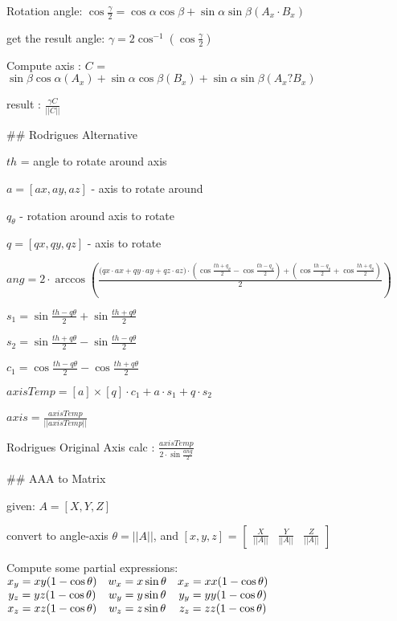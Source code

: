 Rotation angle: $\cos \frac{\gamma}{2} = \cos \alpha   \cos \beta  + \sin \alpha    \sin \beta  (  A_x \cdot B_x )$

get the result angle: $ \gamma = 2 \cos^{-1}( \cos \frac {\gamma}{2} )$


Compute axis : $C$ = $  \sin \beta  \cos \alpha  (A_x)  + \sin \alpha  \cos \beta (B_x) + \sin \alpha \sin \beta  ( A_x ? B_x ) $

result : $\frac {\gamma C} {||C||}$

## Rodrigues Alternative 

$th$ = angle to rotate around axis

$a = [ax,ay,az]$ - axis to rotate around

$q_{\theta}$ - rotation around axis to rotate

$ q = [qx,qy,qz]$ - axis to rotate

${ang} = 2 \cdot \arccos  ( \frac { ({{qx} \cdot {ax}+{qy}\cdot{ay}+{qz}\cdot{az})}\cdot({\cos {\frac {{th} + {q_\theta}} 2}}-{\cos {\frac {{th} - {q_\theta}} 2}}) + ( {\cos {\frac {{th} - {q_\theta}} 2}} + {\cos {\frac {{th} + {q_\theta}} 2}} ) } 2   )$

${s_1} = {\sin {\frac {{th} - {q\theta}} 2}} + {\sin {\frac {{th} + {q\theta}} 2}} $

${s_2} = {\sin {\frac {{th} + {q\theta}} 2}} - {\sin {\frac {{th} - {q\theta}} 2}} $

${c_1} = {\cos {\frac {{th} - {q\theta}} 2}} - {\cos {\frac {{th} + {q\theta}} 2}} $

${axisTemp} = {[{a}] \times [{q}]}\cdot {c_1} + {a}\cdot{s_1} + {q}\cdot{s_2} $

${axis} = \frac {axisTemp} { ||{axisTemp}|| } $

Rodrigues Original Axis calc : $\frac {axisTemp} {2 \cdot \sin  \frac {ang} 2 } $



## AAA to Matrix

given: ${A} = [X, Y ,Z] $

convert to angle-axis  $ \theta = ||A|| $, and $[x,y,z]$ = $\begin{bmatrix} \frac {X} {||A||} & \frac {Y} {||A||} &  \frac {Z} {||A||} \end{bmatrix} $


Compute some partial expressions:$\begin{matrix}
   x_y = xy(1-\cos \theta) &   w_x = x\sin \theta  &  x_x = xx(1-\cos \theta) \\
   y_z = yz(1-\cos \theta) &    w_y = y\sin \theta &  y_y = yy(1-\cos \theta) \\
   x_z = xz(1-\cos \theta) &    w_z = z\sin \theta &  z_z = zz(1-\cos \theta) 
\end{matrix}\\$


